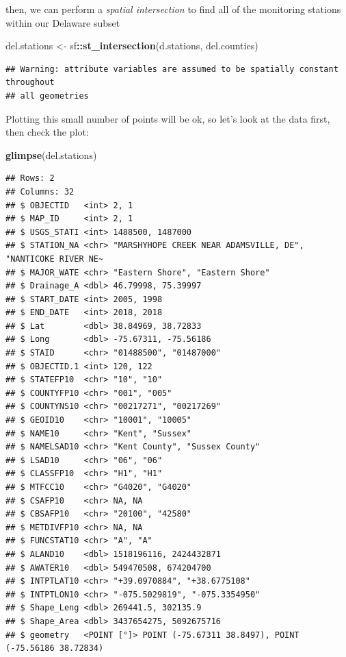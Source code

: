 \documentclass[]{article}
\newenvironment{Shaded}{\begin{snugshade}}{\end{snugshade}}
\newcommand{\FunctionTok}[1]{\textcolor[rgb]{0.13,0.29,0.53}{\textbf{#1}}}
\newcommand{\NormalTok}[1]{#1}
\newcommand{\OtherTok}[1]{\textcolor[rgb]{0.56,0.35,0.01}{#1}}
\newcommand{\SpecialCharTok}[1]{\textcolor[rgb]{0.81,0.36,0.00}{\textbf{#1}}}
\begin{document}
then, we can perform a \emph{spatial intersection} to find all of the
monitoring stations within our Delaware subset

\begin{Shaded}
\begin{Highlighting}[]
\NormalTok{del.stations }\OtherTok{\textless{}{-}}\NormalTok{ sf}\SpecialCharTok{::}\FunctionTok{st\_intersection}\NormalTok{(d.stations, del.counties)}
\end{Highlighting}
\end{Shaded}

\begin{verbatim}
## Warning: attribute variables are assumed to be spatially constant throughout
## all geometries
\end{verbatim}

Plotting this small number of points will be ok, so let's look at the
data first, then check the plot:

\begin{Shaded}
\begin{Highlighting}[]
\FunctionTok{glimpse}\NormalTok{(del.stations)}
\end{Highlighting}
\end{Shaded}

\begin{verbatim}
## Rows: 2
## Columns: 32
## $ OBJECTID   <int> 2, 1
## $ MAP_ID     <int> 2, 1
## $ USGS_STATI <int> 1488500, 1487000
## $ STATION_NA <chr> "MARSHYHOPE CREEK NEAR ADAMSVILLE, DE", "NANTICOKE RIVER NE~
## $ MAJOR_WATE <chr> "Eastern Shore", "Eastern Shore"
## $ Drainage_A <dbl> 46.79998, 75.39997
## $ START_DATE <int> 2005, 1998
## $ END_DATE   <int> 2018, 2018
## $ Lat        <dbl> 38.84969, 38.72833
## $ Long       <dbl> -75.67311, -75.56186
## $ STAID      <chr> "01488500", "01487000"
## $ OBJECTID.1 <int> 120, 122
## $ STATEFP10  <chr> "10", "10"
## $ COUNTYFP10 <chr> "001", "005"
## $ COUNTYNS10 <chr> "00217271", "00217269"
## $ GEOID10    <chr> "10001", "10005"
## $ NAME10     <chr> "Kent", "Sussex"
## $ NAMELSAD10 <chr> "Kent County", "Sussex County"
## $ LSAD10     <chr> "06", "06"
## $ CLASSFP10  <chr> "H1", "H1"
## $ MTFCC10    <chr> "G4020", "G4020"
## $ CSAFP10    <chr> NA, NA
## $ CBSAFP10   <chr> "20100", "42580"
## $ METDIVFP10 <chr> NA, NA
## $ FUNCSTAT10 <chr> "A", "A"
## $ ALAND10    <dbl> 1518196116, 2424432871
## $ AWATER10   <dbl> 549470508, 674204700
## $ INTPTLAT10 <chr> "+39.0970884", "+38.6775108"
## $ INTPTLON10 <chr> "-075.5029819", "-075.3354950"
## $ Shape_Leng <dbl> 269441.5, 302135.9
## $ Shape_Area <dbl> 3437654275, 5092675716
## $ geometry   <POINT [°]> POINT (-75.67311 38.8497), POINT (-75.56186 38.72834)
\end{verbatim}
\end{document}
